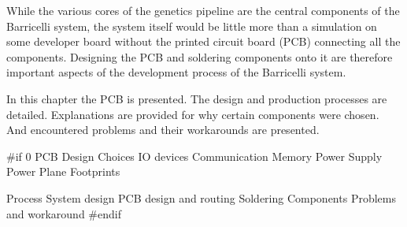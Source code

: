 
While the various cores of the genetics pipeline are the central components of the Barricelli system, the system itself would be little more than a simulation on some developer board without the printed circuit board (PCB) connecting all the components.
Designing the PCB and soldering components onto it are therefore important aspects of the development process of the Barricelli system.

In this chapter the PCB is presented.
The design and production processes are detailed.
Explanations are provided for why certain components were chosen.
And encountered problems and their workarounds are presented.

 \label{pcb:section:design_choices}

 \label{pcb:section:power_supply}

 \label{pcb:section:power_plane}

 \label{pcb:section:footprints}

 \label{pcb:section:process}

 \label{pcb:section:problems_and_workaround}

\#if 0
PCB
    Design Choices
        IO devices
        Communication
        Memory
    Power Supply
    Power Plane
    Footprints
        
    Process
        System design
        PCB design and routing
        Soldering
    Components
    Problems and workaround
\#endif
